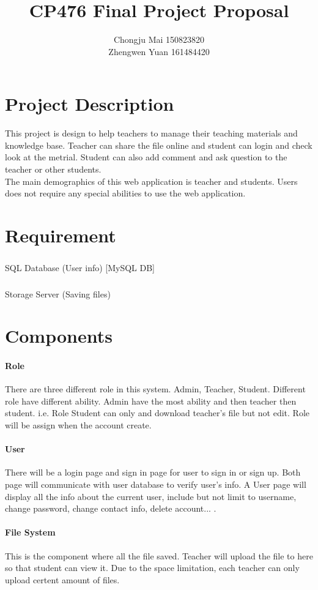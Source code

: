 \documentclass{article}
\title {CP476 Final Project Proposal}
\author {Chongju Mai 150823820 \\ Zhengwen Yuan 161484420}
\begin{document}
\maketitle
\tableofcontents
\newpage

\section {Project Description}
This project is design to help teachers to manage their teaching materials and knowledge base. Teacher can share the file online and student can login and check look at the metrial. Student can also add comment and ask question to the teacher or other students.\\
The main demographics of this web application is teacher and students. Users does not require any special abilities to use the web application. 

\section {Requirement}

\subparagraph{} SQL Database (User info) [MySQL DB]
\subparagraph{} Storage Server (Saving files)


\section {Components}
\paragraph {Role} There are three different role in this system. Admin, Teacher, Student. Different role have different ability. Admin have the most ability and then teacher then student. i.e. Role Student can only and download teacher's file but not edit. Role will be assign when the account create.

\paragraph {User} There will be a login page and sign in page for user to sign in or sign up. Both page will communicate with user database to verify user's info. A User page will display all the info about the current user, include but not limit to username, change password, change contact info, delete account... . 

\paragraph {File System} This is the component where all the file saved. Teacher will upload the file to here so that student can view it. Due to the space limitation, each teacher can only upload certent amount of files.
\end{document}
